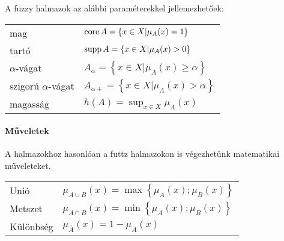 \documentclass[../../main.tex]{subfiles}
\begin{document}
A fuzzy halmazok az alábbi paraméterekkel jellemezhetőek:
\begin{center}
  \begin{tabular}{l l}
    mag                    & $\operatorname{core} A = \left\{ x \in X | \mu_A(x) = 1 \right\}$          \\
    tartó                  & $\operatorname{supp} A = \left\{ x \in X | \mu_A(x) > 0 \right\}$          \\
    $\alpha$-vágat         & $A_\alpha = \left\{ x \in X | \mu_A(x) \geq \alpha \right\}$ \\
    szigorú $\alpha$-vágat & $A_{\alpha+} = \left\{ x \in X | \mu_A(x) > \alpha \right\}$ \\
    magasság               & $h(A) = \sup_{x \in X} \mu_A(x)$                             \\
  \end{tabular}
\end{center}

\paragraph{Műveletek}
A halmazokhoz hasonlóan a futtz halmazokon is végezhetünk matematikai
műveleteket.
\begin{center}
  \begin{tabular}{l l}
    Unió      & $\mu_{A \cup B}(x) = \max \left\{ \mu_A(x); \mu_B(x) \right\}$ \\
    Metszet   & $\mu_{A \cap B}(x) = \min \left\{ \mu_A(x); \mu_B(x) \right\}$ \\
    Különbség & $\mu_{\overline A}(x) = 1 - \mu_A(x)$                          \\
  \end{tabular}
\end{center}
\end{document}
